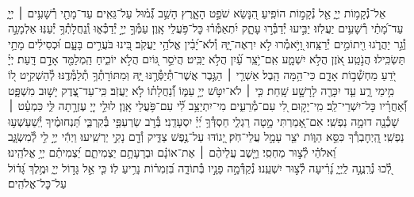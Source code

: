 \documentclass[twoside, openany, parskip=half, 11pt]{book}
\begin{document}
{\\
\vspace{-1.5\baselineskip}
\begin{narrow}
אֵל־נְ֯קָמ֥וֹת יְיָ֑ אֵ֖ל נְ֯קָמ֣וֹת הוֹפִֽיעַ׃
הִ֭נָּשֵׂא שֹׁפֵ֣ט הָאָ֑רֶץ הָשֵׁ֥ב גְּ֯֝מ֗וּל עַל־גֵּאִֽים׃
עַד־מָתַ֖י רְ֯שָׁעִ֥ים ׀ יְיָ֑ עַד־מָ֝תַ֗י רְ֯שָׁעִ֥ים יַעֲלֹֽזוּ׃
יַבִּ֣יעוּ יְ֯דַבְּ֯ר֣וּ עָתָ֑ק יִ֝תְאַמְּ֯ר֗וּ כׇּל־פֹּ֥עֲלֵי אָֽוֶן׃
עַמְּ֯ךָ֣ יְיָ֣ יְ֯דַכְּ֯א֑וּ וְֽ֯נַחֲלָתְ֯ךָ֥ יְ֯עַנּֽוּ׃
אַלְמָנָ֣ה וְ֯גֵ֣ר יַהֲרֹ֑גוּ וִ֖יתוֹמִ֣ים יְ֯רַצֵּֽחוּ׃
וַ֭יֹּ֣אמְ֯רוּ לֹ֣א יִרְאֶה־יָּ֑הּ וְ֯לֹא־יָ֝בִ֗ין אֱלֹהֵ֥י יַעֲקֹֽב׃
בִּ֭ינוּ בֹּעֲרִ֣ים בָּעָ֑ם וּ֝כְסִילִ֗ים מָתַ֥י תַּשְׂכִּֽילוּ׃
הֲנֹ֣טַֽע אֹ֭זֶן הֲלֹ֣א יִשְׁמָ֑ע אִֽם־יֹ֥צֵֽר עַ֗֝יִן הֲלֹ֣א יַבִּֽיט׃
הֲיֹסֵ֣ר גּ֭וֹיִם הֲלֹ֣א יוֹכִ֑יחַ הַֽמְלַמֵּ֖ד אָדָ֣ם דָּֽעַת׃
יְיָ֗ יֹ֭דֵעַ מַחְשְׁ֯ב֣וֹת אָדָ֑ם כִּי־הֵ֥מָּה הָֽבֶל׃
אַשְׁרֵ֤י ׀ הַגֶּ֣בֶר אֲשֶׁר־תְּ֯יַסְּ֯רֶ֣נּוּ יָּ֑הּ וּֽמִתּוֹרָתְ֯ךָ֥ תְ֯לַמְּ֯דֶֽנּוּ׃
לְ֯הַשְׁקִ֣יט ל֭וֹ מִ֣ימֵי רָ֑ע עַ֤ד יִכָּרֶ֖ה לָרָשָׁ֣ע שָֽׁחַת׃
כִּ֤י ׀ לֹא־יִטֹּ֣שׁ יְיָ֣ עַמּ֑וֹ וְ֯֝נַחֲלָת֗וֹ לֹ֣א יַעֲזֹֽב׃
כִּֽי־עַד־צֶ֭דֶק יָשׁ֣וּב מִשְׁפָּ֑ט וְ֯֝אַחֲרָ֗יו כׇּל־יִשְׁרֵי־לֵֽב׃
מִֽי־יָק֣וּם לִ֭י עִם־מְ֯רֵעִ֑ים מִי־יִתְיַצֵּ֥ב לִ֗֝י עִם־פֹּ֥עֲלֵי אָֽוֶן׃
לוּלֵ֣י יְיָ֭ עֶזְרָ֣תָה לִּ֑י כִּמְעַ֓ט ׀ שָׁכְ֯נָ֖ה דוּמָ֣ה נַפְשִֽׁי׃
אִם־אָ֭מַרְתִּי מָ֣טָה רַגְלִ֑י חַסְדְּ֯ךָ֥ יְ֝יָ֗ יִסְעָדֵֽנִי׃
בְּ֯רֹ֣ב שַׂרְעַפַּ֣י בְּ֯קִרְבִּ֑י תַּ֝נְחוּמֶ֗יךָ יְֽ֯שַׁעַשְׁע֥וּ נַפְשִֽׁי׃
הַֽ֭יְחׇבְרְ֯ךָ כִּסֵּ֣א הַוּ֑וֹת יֹצֵ֖ר עָמָ֣ל עֲלֵי־חֹֽק׃
יָ֭גוֹדּוּ עַל־נֶ֣פֶשׁ צַדִּ֑יק וְ֯דָ֖ם נָקִ֣י יַרְשִֽׁיעוּ׃
וַיְהִ֬י יְיָ֣ לִ֣י לְ֯מִשְׂגָּ֑ב וֵ֝אלֹהַ֗י לְ֯צ֣וּר מַחְסִֽי׃
וַיָּ֤שֶׁב עֲלֵיהֶ֨ם ׀ אֶת־אוֹנָ֗ם וּבְרָעָתָ֥ם יַצְמִיתֵ֑ם יַ֝צְמִיתֵ֗ם יְיָ֥ אֱלֹהֵֽינוּ׃\\

לְ֭֯כוּ נְ֯רַֽנֲנָ֣ה לַֽיְיָ֑ נָ֝רִ֗יעָה לְ֯צ֣וּר יִשְׁעֵֽנוּ׃ נְ֯קַדְּ֯מָ֣ה פָנָ֣יו בְּ֯תוֹדָ֑ה בִּ֝זְמִר֗וֹת נָרִ֥יעַ לֽוֹ׃ כִּ֤י אֵ֣ל גָּד֣וֹל יְיָ֑ וּמֶ֥לֶךְ גָּ֝ד֗וֹל עַל־כׇּל־אֱלֹהִֽים׃
\end{narrow}

}
\end{document}

